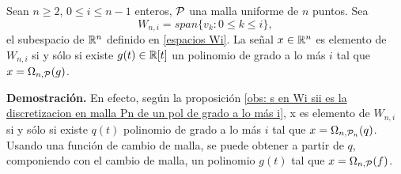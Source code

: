  
\begin{cor}
\label{cor: 18ap}
Sean $n\geq 2$, $0 \leq i \leq n-1$ enteros,
$\mathcal{P}$ una malla uniforme de $n$ puntos. 
Sea
\begin{equation*}
\label{def de espacios Wk}
W_{n,i}= span\{ v_{k} : 0 \leq k \leq i \},
\end{equation*}
el subespacio de $\mathbb{R}^{n}$ 
definido en \eqref{espacios Wi}.
La señal
$x \in \mathbb{R}^{n}$ es elemento de $W_{n,i}$ si y sólo si 
existe
$g(t) \in \mathbb{R}[t]$ un polinomio de grado a lo más $i$
tal que 
$x = \Omega_{n, \mathcal{P}}(g)$.
\end{cor}
\noindent
\textbf{Demostración.}
En efecto, según la 
proposición \ref{obs: s en Wi sii es la discretizacion en malla Pn de un pol de grado a lo más i}, x es elemento de $W_{n,i}$ si y sólo si existe $q(t)$ polinomio
de grado a lo más $i$ tal que $x = \Omega_{n, \mathcal{P}_{n}}(q)$. Usando una función
de cambio de malla, se puede obtener a partir de $q$, componiendo con el 
cambio de malla, un polinomio $g(t)$ tal que 
$x = \Omega_{n, \mathcal{P}}(f)$.
\QEDB
\vspace{0.2cm}

